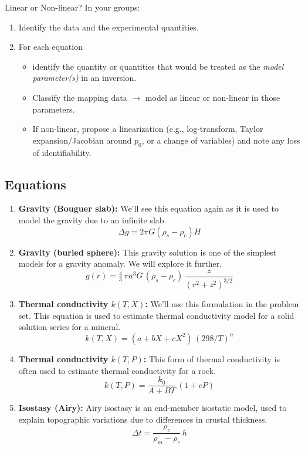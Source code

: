 \begin{activity}{Linear or Non-linear?}
In your groups:
\begin{enumerate}[label=\arabic*.,itemsep=2pt]
  \item Identify the data and the experimental quantities.
  \item For each equation
  \begin{itemize}
    \item identify the quantity or quantities that would be treated as the \emph{model parameter(s)} in an inversion.
    \item Classify the mapping data $\to$ model as linear or non-linear in those parameters.
    \item If non-linear, propose a linearization (e.g., log-transform, Taylor expansion/Jacobian around $p_0$, or a change of variables) and note any loss of identifiability.
  \end{itemize}
\end{enumerate}

\subsection*{Equations}
\begin{enumerate}[label=Q\arabic*.,itemsep=6pt]
  \item \textbf{Gravity (Bouguer slab):}
  We'll see this equation again as it is used to model the gravity due to an infinite slab.
  \[
    \Delta g = 2\pi G(\rho_s - \rho_c)H
  \]
  \answerbox[2cm]

  \item \textbf{Gravity (buried sphere):} 
  This gravity solution is one of the simplest models for a gravity anomaly.  We will explore it further.
  \[
    g(r) = \tfrac{4}{3}\, \pi a^3 G\, (\rho_s - \rho_c) \, \dfrac{z}{(r^2+z^2)^{3/2}}
  \]
  \answerbox[2cm]

  \item \textbf{Thermal conductivity $k(T,X)$:} 
  We'll use this formulation in the problem set.  This equation is used  to estimate thermal conductivity model for a solid solution series for a mineral.
  \[
    k(T,X) = (a + bX + cX^2)\,(298/T)^n
  \]
  \answerbox[2cm]

  \item \textbf{Thermal conductivity $k(T,P)$:} 
  This form of thermal conductivity is often used to estimate thermal conductivity for a rock.
  \[
    k(T,P) = \dfrac{k_0}{A + BT}\,(1 + cP)
  \]
  \answerbox[2cm]

  \item \textbf{Isostasy (Airy):}
  Airy isostasy is an end-member isostatic model, used to explain topographic variations due to differences in crustal thickness.
  \[
    \Delta t = \dfrac{\rho_c}{\rho_m - \rho_c}\,h
  \]
  \answerbox[2cm]


\end{enumerate}
\end{activity}

